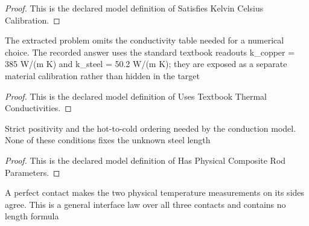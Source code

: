 \begin{proof}
  This is the declared model definition of Satisfies Kelvin Celsius Calibration.
\end{proof}
\begin{definition}
  \label{def:physics:phyx-mini-0331:phyxminiproblems-problemphyxmini0331-usestextbookthermalconductivities}
  The extracted problem omits the conductivity table needed for a numerical choice. The recorded answer uses the standard textbook readouts k\_copper = 385 W/(m K) and k\_steel = 50.2 W/(m K); they are exposed as a separate material calibration rather than hidden in the target
\end{definition}
\begin{proof}
  This is the declared model definition of Uses Textbook Thermal Conductivities.
\end{proof}
\begin{definition}
  \label{def:physics:phyx-mini-0331:phyxminiproblems-problemphyxmini0331-hasphysicalcompositerodparameters}
  Strict positivity and the hot-to-cold ordering needed by the conduction model. None of these conditions fixes the unknown steel length
\end{definition}
\begin{proof}
  This is the declared model definition of Has Physical Composite Rod Parameters.
\end{proof}
\begin{definition}
  \label{def:physics:phyx-mini-0331:phyxminiproblems-problemphyxmini0331-satisfiesperfectthermalcontactlaw}
  A perfect contact makes the two physical temperature measurements on its sides agree. This is a general interface law over all three contacts and contains no length formula
\end{definition}

